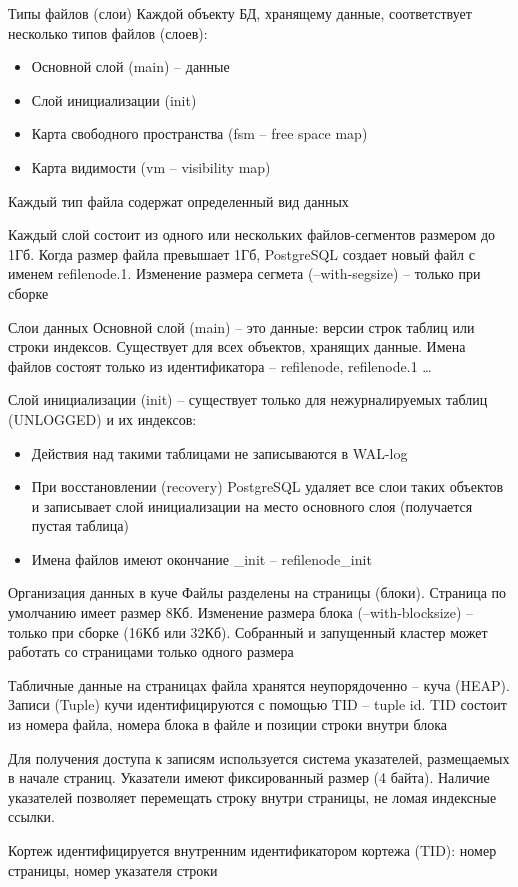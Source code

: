 \documentclass[12pt]{article}
\begin{document}
\begin{nota}{Типы файлов (слои)}
    Каждой объекту БД, хранящему данные, соответствует несколько типов файлов (слоев):

    \begin{itemize}
        \item Основной слой (main) -- данные 
        \item Слой инициализации (init)
        \item Карта свободного пространства (fsm -- free space map)
        \item Карта видимости (vm -- visibility map)
    \end{itemize}

    Каждый тип файла содержат определенный вид данных 

    Каждый слой состоит из одного или нескольких файлов-сегментов размером до 1Гб. Когда размер файла превышает 1Гб, PostgreSQL создает новый файл с именем refilenode.1. Изменение размера сегмета (--with-segsize) -- только при сборке 
\end{nota}

\begin{nota}{Слои данных}
    Основной слой (main) -- это данные: версии строк таблиц или строки индексов. Существует для всех объектов, хранящих данные. Имена файлов состоят только из идентификатора -- refilenode, refilenode.1 \dots 

    Слой инициализации (init) -- существует только для нежурналируемых таблиц (UNLOGGED) и их индексов:

    \begin{itemize}
        \item Действия над такими таблицами не записываются в WAL-log 
        \item При восстановлении (recovery) PostgreSQL удаляет все слои таких объектов и записывает слой инициализации на место основного слоя (получается пустая таблица)
        \item Имена файлов имеют окончание \_init -- refilenode\_init
    \end{itemize}
\end{nota}

\begin{nota}{Организация данных в куче}
    Файлы разделены на страницы (блоки). Страница по умолчанию имеет размер 8Кб. Изменение размера блока (--with-blocksize) -- только при сборке (16Кб или 32Кб). Собранный и запущенный кластер может работать со страницами только одного размера 

    Табличные данные на страницах файла хранятся неупорядоченно -- куча (HEAP). Записи (Tuple) кучи идентифицируются с помощью TID -- tuple id. TID состоит из номера файла, номера блока в файле и позиции строки внутри блока 

    Для получения доступа к записям используется система указателей, размещаемых в начале страниц. Указатели имеют фиксированный размер (4 байта). Наличие указателей позволяет перемещать строку внутри страницы, не ломая индексные ссылки.

    Кортеж идентифицируется внутренним идентификатором кортежа (TID): номер страницы, номер указателя строки 
\end{nota}
\end{document}

